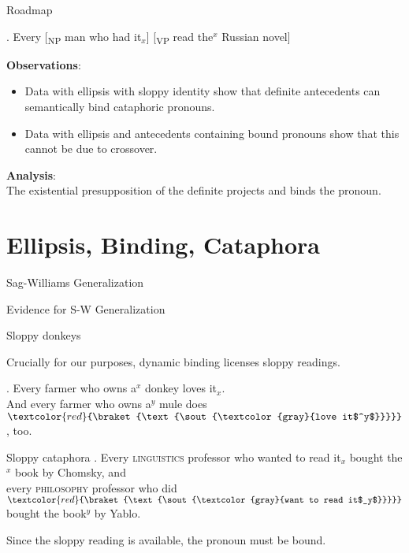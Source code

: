 \documentclass{beamer}
\newcommand{\elide}[1]{\ensuremath{\textcolor{red}{\braket{\text{\sout{\textcolor{gray}{#1}}}}}}}
\begin{document}
\begin{frame}{Roadmap}

\ex.
  Every [\textsubscript{NP} man who had \alert{it$_x$}] [\textsubscript{VP} read \alert{the$^x$ Russian novel}]

{\bf Observations}:
\begin{itemize}
  \item Data with \alert{ellipsis with sloppy identity} show that definite antecedents can semantically bind cataphoric pronouns.
  \item Data with ellipsis and antecedents containing bound pronouns show that this cannot be due to \alert{crossover}.
\end{itemize}

{\bf Analysis}:\\
The existential presupposition of the definite projects and binds the pronoun.

\end{frame}

\section{Ellipsis, Binding, Cataphora}

\begin{frame}{Sag-Williams Generalization}


\end{frame}


\begin{frame}{Evidence for S-W Generalization}


\end{frame}

\begin{frame}{Sloppy donkeys}

Crucially for our purposes, dynamic binding licenses sloppy readings.

\ex.
  Every farmer who owns a$^x$ donkey loves it$_x$.\\
  And every farmer who owns a$^y$ mule does \elide{love it$^y$}, too.


\end{frame}


\begin{frame}{Sloppy cataphora}
  \ex. Every \textsc{linguistics} professor who wanted to read it$_x$ bought the$^x$ book by Chomsky, and\\
  every \textsc{philosophy} professor who did \elide{want to read it$_y$} bought the book$^y$ by Yablo.

Since the sloppy reading is available, the pronoun must be bound.

\end{frame}
\end{document}
